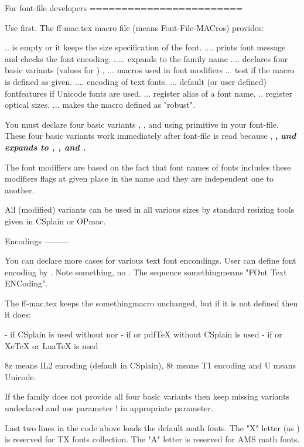 For font-file developers
========================

Use \ifx\ffdecl\undefined  \fi first. The ff-mac.tex macro
file (means Font-File-MACros) provides:

\sizespec .. is empty or it keeps the size specification of the font.
\ffdecl .... prints font message and checks the font encoding.
\fffam ..... expands to the family name
\ffvars .... declares four basic variants (values for \ffvarV)
\setfmV, \setfm ... macros used in font modifiers
\ismacro ... test if the macro is defined as given. 
\fotenc .... encoding of text fonts.
\fontfeatures ... default (or user defined) fontfeatures if Unicode 
             fonts are used.
\ffalias ... register alias of a font name.
\regsizes .. register optical sizes.  
\tryprotected ... makes the macro defined as "robust".

You must declare four basic variants \tenrm, \tembf, \tenit and \tenbi
using \font primitive in your font-file. These four basic variants work 
immediately after font-file is read because \rm, \bf, \it and \bi expands 
to \tenrm, \tenbf, \tenit and \tenbi. 

The font modifiers are based on the fact that font names of fonts includes
these modifiers flags at given place in the name and they are independent
one to another.

All (modified) variants can be used in all various sizes by standard
resizing tools given in CSplain or OPmac.


Encodings
---------

You can declare more cases for various text font encondings. User can define
font encoding by \def\fotenc{something}. Note \fotenc, no \fontenc. The
sequence \fotenc means "FOnt Text ENCoding".

The ff-mac.tex keeps the \fotenc macro unchanged, but if it is not defined then it does:

- \def\fotenc{8z} if CSplain is used without  nor 
- \def\fotenc{8t} if  or pdfTeX without CSplain is used
- \def\fotenc{U}  if  or XeTeX or LuaTeX is used

8z means IL2 encoding (default in CSplain), 8t means T1 encoding and U means
Unicode.

If the family does not provide all four basic variants then keep missing
variants undeclared and use parameter {!} in appropriate \ffvars parameter.

Last two lines in the code above loads the default math fonts. The "X"
letter (as \mathpreloaded) is reserved for TX fonts collection. The "A"
letter is reserved for AMS math fonts.


